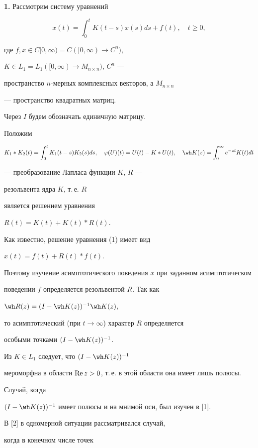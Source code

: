 {\bf 1.} Рассмотрим систему уравнений


\begin{equation}


x(t)=\int_0^t K(t-s)x(s)ds+f(t),\quad  t \geq 0,


\end{equation}


где $f, x\in C[0,\infty)=C([0,\infty )\rightarrow C^n)$,


$K\in L_1=L_1([0,\infty)\rightarrow M_{n\times n})$, $C^n$ ---


пространство $n$-мерных комплексных векторов, а $M_{n\times n}$


--- пространство квадратных матриц. 


Через $I$ будем обозначать единичную матрицу.


Положим


$$


K_1*K_2(t)=\int_0^t K_1(t-s)K_2(s)ds,\quad \varphi(U)(t)=U(t)-K*U(t),\quad


\wh K(z)=\int_0^{\infty} e^{-zt}K(t)dt


$$


--- преобразование Лапласа функции $K$, $R$ ---


резольвента ядра $K$, т.\,е. $R$


является решением уравнения


$R(t)=K(t)+K(t)*R(t)$.


Как известно, решение уравнения (1) имеет вид


$x(t)=f(t)+R(t)*f(t)$.


Поэтому изучение асимптотического поведения $x$ при заданном асимптотическом


поведении $f$ определяется резольвентой $R$. Так как


$\wh R(z)=(I-\wh K(z))^{-1}\wh K(z),$


то асимптотический (при $t\rightarrow\infty$) характер $R$ определяется


особыми точками $(I-\wh K(z))^{-1}$.


Из $K\in L_1$ следует, что $(I-\wh K(z))^{-1}$


мероморфна в области $\operatorname{Re} z>0$, т.\,е. в этой области она имеет лишь полюсы.


Случай, когда


$(I-\wh K(z))^{-1}$ имеет полюсы и на мнимой оси, был изучен в [1].


В [2] в одномерной ситуации рассматривался случай,


когда в конечном числе точек


